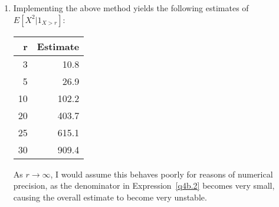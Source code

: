 \documentclass[12pt]{article}
\theoremstyle{plain}
\theoremstyle{definition}
\theoremstyle{remark}
\begin{document}
\begin{enumerate}
\begin{enumerate}



      \item %
        Implementing the above method yields the following estimates of
        $E[X^2|1_{X>r}]$:
        \begin{table}[htpb!]
          \centering
          \begin{tabular}{r|r}
            r & Estimate \\\hline\hline
            3  & 10.8  \\
            5  & 26.9  \\
            10 & 102.2 \\
            20 & 403.7 \\
            25 & 615.1 \\
            30 & 909.4 \\
          \end{tabular}
        \end{table}
        As $r\rightarrow\infty$, I would assume this behaves poorly for
        reasons of numerical precision, as the denominator in
        Expression~\ref{q4b.2} becomes very small, causing the overall
        estimate to become very unstable.

    \end{enumerate}


\end{enumerate}
\end{document}
